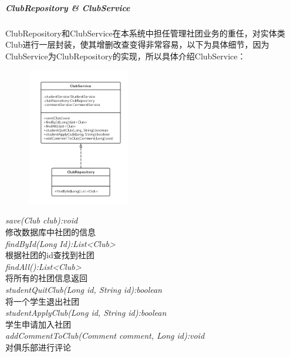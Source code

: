 \documentclass[UTF8]{ctexart}
\begin{document}
\subparagraph{ClubRepository \& ClubService}
ClubRepository和ClubService在本系统中担任管理社团业务的重任，对实体类Club进行一层封装，使其增删改查变得非常容易，以下为具体细节，因为ClubService为ClubRepository的实现，所以具体介绍ClubService：
\newline
\begin{figure}[H]
\centering
\includegraphics[width = 0.4\textwidth]{club-rs.png}
\end{figure}
\begin{center}
\emph{save(Club club):void}\\
修改数据库中社团的信息\\
\emph{findById(Long Id):List<Club>}\\
根据社团的id查找到社团\\
\emph{findAll():List<Club>}\\
将所有的社团信息返回\\
\emph{studentQuitClub(Long id, String id):boolean}\\
将一个学生退出社团\\
\emph{studentApplyClub(Long id, String id):boolean}\\
学生申请加入社团\\
\emph{addCommentToClub(Comment comment, Long id):void}\\
对俱乐部进行评论\\
\end{center}
\end{document}
